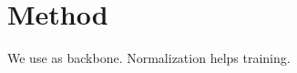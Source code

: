 \section{Method}
We use \cite{krizhevsky2012imagenet} as backbone.
Normalization \cite{ioffe2015batch} helps training.
